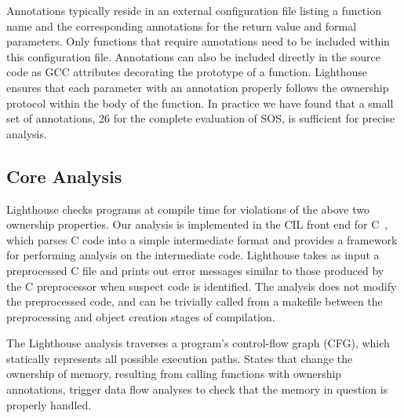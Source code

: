Annotations typically reside in an external configuration file listing
a function name and the corresponding annotations for the return value
and formal parameters.
%
Only functions that require annotations need to be included within
this configuration file.
%
Annotations can also be included directly in the source code as GCC
attributes decorating the prototype of a function.
%
Lighthouse ensures that each parameter with an annotation properly
follows the ownership protocol within the body of the function.
%
In practice we have found that a small set of annotations, 26 for the
complete evaluation of SOS, is sufficient for precise analysis.


\subsection{Core Analysis}

Lighthouse checks programs at compile time for violations of the above
two ownership properties.  
%
Our analysis is implemented in the CIL front end for C~\cite{CIL},
which parses C code into a simple intermediate format and provides a
framework for performing analysis on the intermediate code. 
%
Lighthouse takes as input a preprocessed C file and prints out error
messages similar to those produced by the C preprocessor when suspect
code is identified.
%
The analysis does not modify the preprocessed code, and can be
trivially called from a makefile between the preprocessing and object
creation stages of compilation.


The Lighthouse analysis traverses a program's control-flow graph
(CFG), which statically represents all possible execution paths.  
%
States that change the ownership of memory, resulting from calling
functions with ownership annotations, trigger data flow analyses to
check that the memory in question is properly handled.


